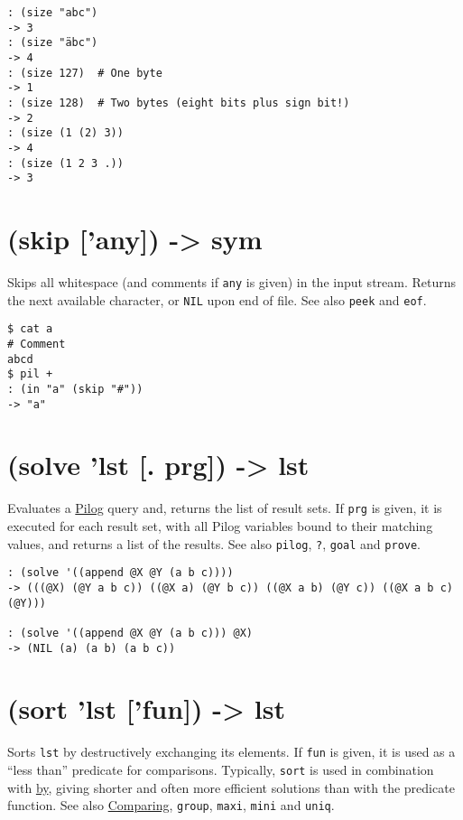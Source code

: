 {{{{{{{{\begin{verbatim}
: (size "abc")
-> 3
: (size "äbc")
-> 4
: (size 127)  # One byte
-> 1
: (size 128)  # Two bytes (eight bits plus sign bit!)
-> 2
: (size (1 (2) 3))
-> 4
: (size (1 2 3 .))
-> 3
\end{verbatim}

 
\section{(skip ['any]) -> sym}
\label{sec-8-1-19-25}


Skips all whitespace (and comments if \texttt{any} is given) in the input
stream. Returns the next available character, or \texttt{NIL} upon end of file.
See also \texttt{peek} and \texttt{eof}.


\begin{verbatim}
$ cat a
# Comment
abcd
$ pil +
: (in "a" (skip "#"))
-> "a"
\end{verbatim}

 
\section{(solve 'lst [. prg]) -> lst}
\label{sec-8-1-19-26}


Evaluates a \hyperref[ref.html-pilog]{Pilog} query and, returns the list of
result sets. If \texttt{prg} is given, it is executed for each result set, with
all Pilog variables bound to their matching values, and returns a list
of the results. See also \texttt{pilog}, \texttt{?}, \texttt{goal} and \texttt{prove}.


\begin{verbatim}
: (solve '((append @X @Y (a b c))))
-> (((@X) (@Y a b c)) ((@X a) (@Y b c)) ((@X a b) (@Y c)) ((@X a b c) (@Y)))

: (solve '((append @X @Y (a b c))) @X)
-> (NIL (a) (a b) (a b c))
\end{verbatim}

 
\section{(sort 'lst ['fun]) -> lst}
\label{sec-8-1-19-27}


Sorts \texttt{lst} by destructively exchanging its elements. If \texttt{fun} is given,
it is used as a ``less than'' predicate for comparisons. Typically, \texttt{sort}
is used in combination with \hyperref[refB.html-by]{by}, giving shorter and
often more efficient solutions than with the predicate function. See
also \hyperref[ref.html-cmp]{Comparing}, \texttt{group}, \texttt{maxi}, \texttt{mini} and \texttt{uniq}.


}}}}}}}}
